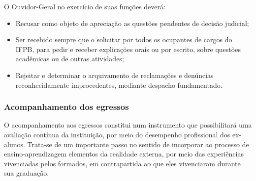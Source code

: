       O Ouvidor-Geral no exercício de suas funções deverá:

\begin{itemize}
\item Recusar como objeto de apreciação as questões pendentes de decisão judicial;

\item Ser recebido sempre que o solicitar por todos os ocupantes de cargos do IFPB, para pedir e receber explicações orais ou por escrito, sobre questões acadêmicas ou de outras atividades;

\item Rejeitar e determinar o arquivamento de reclamações e denúncias reconhecidamente improcedentes, mediante despacho fundamentado.
\end{itemize}




\subsubsection{Acompanhamento dos egressos}

O acompanhamento aos egressos constitui num instrumento que possibilitará uma avaliação cont\'inua da instituição, por meio do desempenho profissional dos ex-alunos. Trata-se de um importante passo no sentido de incorporar ao processo de ensino-aprendizagem elementos da realidade externa, por meio das experiências vivenciadas pelos formados, em contrapartida ao que eles vivenciaram durante sua graduação.

